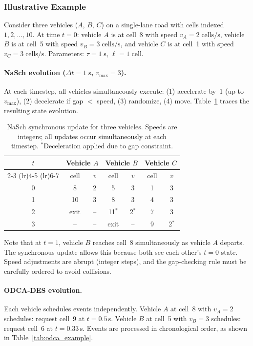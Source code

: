 \documentclass[review,authoryear]{elsarticle}
\begin{document}
\subsubsection{Illustrative Example}

Consider three vehicles ($A$, $B$, $C$) on a single-lane road with cells indexed $1, 2, \ldots, 10$. At time $t=0$: vehicle $A$ is at cell~8 with speed $v_A = 2\;\text{cells/s}$, vehicle $B$ is at cell~5 with speed $v_B = 3\;\text{cells/s}$, and vehicle $C$ is at cell~1 with speed $v_C = 3\;\text{cells/s}$. Parameters: $\tau = 1\;\text{s}$, $\ell = 1\;\text{cell}$.

\paragraph{NaSch evolution ($\Delta t = 1\;\text{s}$, $v_{\max} = 3$).}
At each timestep, all vehicles simultaneously execute: (1) accelerate by~1 (up to $v_{\max}$), (2) decelerate if gap $<$ speed, (3) randomize, (4) move. Table~\ref{tab:nasch_example} traces the resulting state evolution.

\begin{table}[ht]
\centering
\caption{NaSch synchronous update for three vehicles. Speeds are integers; all updates occur simultaneously at each timestep. $^*$Deceleration applied due to gap constraint.}
\label{tab:nasch_example}
\begin{tabular}{@{}ccccccc@{}}
\toprule
$t$ & \multicolumn{2}{c}{Vehicle $A$} & \multicolumn{2}{c}{Vehicle $B$} & \multicolumn{2}{c}{Vehicle $C$} \\
\cmidrule(lr){2-3} \cmidrule(lr){4-5} \cmidrule(lr){6-7}
 & cell & $v$ & cell & $v$ & cell & $v$ \\
\midrule
0 & 8 & 2 & 5 & 3 & 1 & 3 \\
1 & 10 & 3 & 8 & 3 & 4 & 3 \\
2 & exit & -- & 11$^*$ & 2$^*$ & 7 & 3 \\
3 & -- & -- & exit & -- & 9 & 2$^*$ \\
\bottomrule
\end{tabular}
\end{table}

Note that at $t=1$, vehicle $B$ reaches cell~8 simultaneously as vehicle $A$ departs. The synchronous update allows this because both see each other's $t=0$ state. Speed adjustments are abrupt (integer steps), and the gap-checking rule must be carefully ordered to avoid collisions.

\paragraph{ODCA-DES evolution.}
Each vehicle schedules events independently. Vehicle $A$ at cell~8 with $v_A = 2$ schedules: request cell~9 at $t = 0.5$\,s. Vehicle $B$ at cell~5 with $v_B = 3$ schedules: request cell~6 at $t = 0.33$\,s. Events are processed in chronological order, as shown in Table~\ref{tab:odca_example}.
\end{document}
